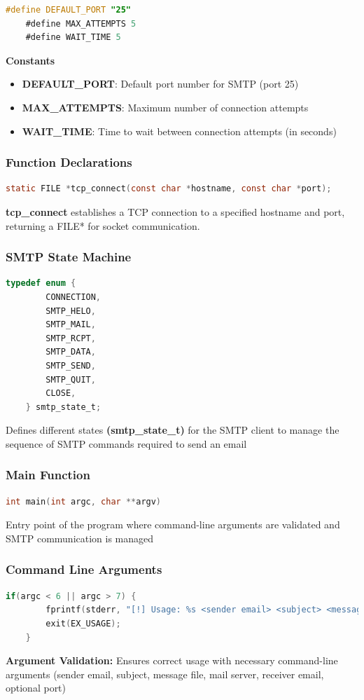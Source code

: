 \documentclass[12pt,a4paper]{article}
\begin{document}
    \begin{lstlisting}[language=C]
    #define DEFAULT_PORT "25"
    #define MAX_ATTEMPTS 5
    #define WAIT_TIME 5
    \end{lstlisting}
    \textbf{Constants}
    \begin{itemize}
        \item \textbf{DEFAULT\_PORT}:  Default port number for SMTP (port 25)
        \item \textbf{MAX\_ATTEMPTS}: Maximum number of connection attempts
        \item \textbf{WAIT\_TIME}: Time to wait between connection attempts (in seconds)
    \end{itemize}

    \subsubsection{Function Declarations}
    \begin{lstlisting}[language=C]
    static FILE *tcp_connect(const char *hostname, const char *port);
    \end{lstlisting}
    \textbf{tcp\_connect} establishes a TCP connection to a specified hostname and port, returning a FILE* for socket communication.

    \subsubsection{SMTP State Machine}
    \begin{lstlisting}[language=C]
    typedef enum {
        CONNECTION,
        SMTP_HELO,
        SMTP_MAIL,
        SMTP_RCPT,
        SMTP_DATA,
        SMTP_SEND,
        SMTP_QUIT,
        CLOSE,
    } smtp_state_t;
    \end{lstlisting}
    Defines different states \textbf{(smtp\_state\_t)} for the SMTP client to manage the sequence of SMTP commands required to send an email

    \subsubsection{Main Function}
    \begin{lstlisting}[language=C]
    int main(int argc, char **argv)
    \end{lstlisting}
    Entry point of the program where command-line arguments are validated and SMTP communication is managed

    \subsubsection{Command Line Arguments}
    \begin{lstlisting}[language=C]
    if(argc < 6 || argc > 7) {
        fprintf(stderr, "[!] Usage: %s <sender email> <subject> <message file> <mail server> <receiver email> [<port>]\n", argv[0]);
        exit(EX_USAGE);
    }
    \end{lstlisting}
    \textbf{Argument Validation:} Ensures correct usage with necessary command-line arguments (sender email, subject, message file, mail server, receiver email, optional port)
\end{document}
